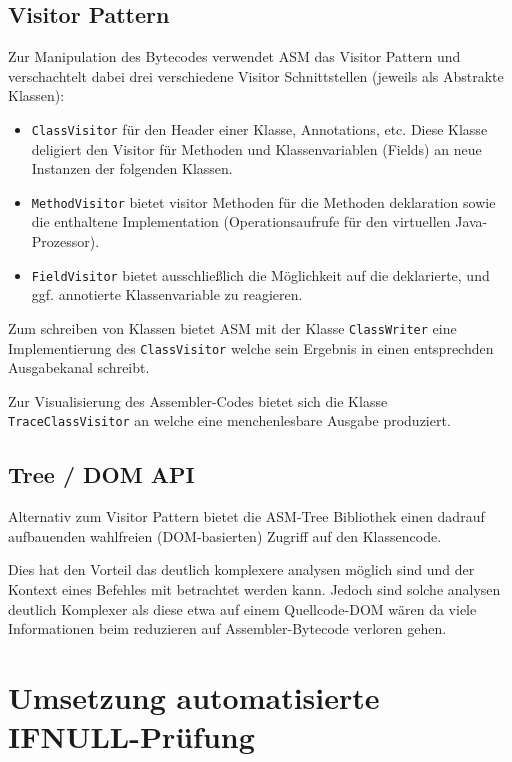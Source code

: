 \subsection{Visitor Pattern}

Zur Manipulation des Bytecodes verwendet ASM das Visitor Pattern und verschachtelt
dabei drei verschiedene Visitor Schnittstellen (jeweils als Abstrakte Klassen):

\begin{itemize}
	\item \texttt{ClassVisitor} für den Header einer Klasse, Annotations, etc.
			Diese Klasse deligiert den Visitor für Methoden und Klassenvariablen (Fields)
			an neue Instanzen der folgenden Klassen.
	\item \texttt{MethodVisitor} bietet visitor Methoden für die Methoden deklaration
			sowie die enthaltene Implementation (Operationsaufrufe für den virtuellen Java-Prozessor).
	\item \texttt{FieldVisitor} bietet ausschließlich die Möglichkeit auf die deklarierte,
			und ggf. annotierte Klassenvariable zu reagieren.
\end{itemize}

Zum schreiben von Klassen bietet ASM mit der Klasse \texttt{ClassWriter} eine
Implementierung des \texttt{ClassVisitor} welche sein Ergebnis in einen entsprechden
Ausgabekanal schreibt.

Zur Visualisierung des Assembler-Codes bietet sich die Klasse \texttt{TraceClassVisitor}
an welche eine menchenlesbare Ausgabe produziert.

\subsection{Tree / DOM API}

Alternativ zum Visitor Pattern bietet die ASM-Tree Bibliothek einen dadrauf aufbauenden
wahlfreien (DOM-basierten) Zugriff auf den Klassencode.

Dies hat den Vorteil das deutlich komplexere analysen möglich sind und der
Kontext eines Befehles mit betrachtet werden kann.
Jedoch sind solche analysen deutlich Komplexer als diese etwa auf
einem Quellcode-DOM wären da viele Informationen beim reduzieren auf
Assembler-Bytecode verloren gehen.

\section{Umsetzung automatisierte IFNULL-Prüfung}

